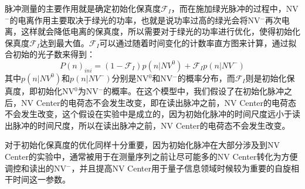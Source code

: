 \documentclass[type = bachelor]{whu-thesis}
\begin{document}
脉冲测量的主要作用就是确定初始化保真度$\mathcal{F}_I$，而在施加绿光脉冲的过程中，NV$^-$的电离作用主要取决于绿光的功率，也就是说功率过高的绿光会将NV$^-$再次电离，这样就会降低电离的保真度，所以需要对于绿光的功率进行优化，使得初始化保真度$\mathcal{F}_I$达到最大值。$\mathcal{F}_I$可以通过随着时间变化的计数率直方图来计算，通过拟合初始的光子数来得到：
\begin{equation}
  P(n)_{ini}=(1-\mathcal{F}_I)p(n|NV^0)+\mathcal{F}_Ip(n|NV^-)
\end{equation}
其中$p(n|NV^0)$和$p(n|NV^-)$分别是NV$^0$和NV$^-$的概率分布，而$\mathcal{F}_I$则是初始化保真度，即初始化NV$^0$为NV$^-$的概率。在这个模型中，我们假设了在初始化脉冲之后，NV Center的电荷态不会发生改变，即在读出脉冲之前，NV Center的电荷态不会发生改变，这个假设在实验中是成立的，因为初始化脉冲的时间尺度远小于读出脉冲的时间尺度，所以在读出脉冲之前，NV Center的电荷态不会发生改变。

对于初始化保真度的优化同样十分重要，因为初始化脉冲在大部分涉及到NV Center的实验中，通常被用于在测量序列之前让尽可能多的NV Center转化为方便调控和读出的NV$^-$，并且提高NV Center用于量子信息领域时候较为重要的自旋相干时间这一参数\cite{Robledo2011}。
\end{document}
